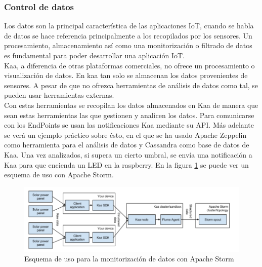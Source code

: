 \documentclass[12pt, twoside]{book}
\begin{document}
\subsubsection*{Control de datos}
Los datos son la principal característica de las aplicaciones IoT, cuando se habla de datos se hace referencia principalmente a los recopilados por los sensores. Un procesamiento, almacenamiento así como una monitorización o filtrado de datos es fundamental para poder desarrollar una aplicación IoT. \\ 

Kaa, a diferencia de otras plataformas comerciales, no ofrece un procesamiento o visualización de datos. En kaa tan solo se almacenan los datos provenientes de sensores. A pesar de que no ofrezca herramientas de análisis de datos como tal, se pueden usar herramientas externas. \\
Con estas herramientas se recopilan los datos almacenados en Kaa de manera que sean estas herramientas las que gestionen y analicen los datos. Para comunicarse con los EndPoints se usan las notificaciones Kaa mediante su API.
Más adelante se verá un ejemplo práctico sobre ésto, en el que se ha usado Apache Zeppelin como herramienta para el análisis de datos y Cassandra como base de datos de Kaa. Una vez analizados, si supera un cierto umbral, se envía una notificación a Kaa para que encienda un LED en la raspberry.
En la figura \ref{L507} se puede ver un esquema de uso con Apache Storm.
\begin{figure}[H]
\centering
\includegraphics[scale=0.6]{images/esquema_apache}
\caption{Esquema de uso para la monitorización de datos con Apache Storm}\label{L507}
\end{figure} 
\end{document}
